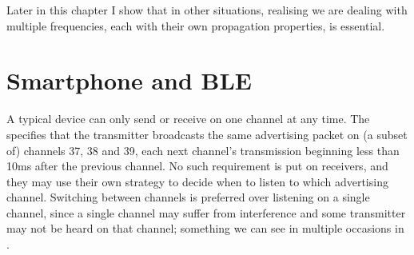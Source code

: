 Later in this chapter I show that in other situations, realising we are dealing with multiple frequencies, each with their own propagation properties, is essential.

\section{Smartphone and BLE}
\label{sec:rss-smartphone}
A typical device can only send or receive on one channel at any time.
The \BTspec \citep{bluetooth40spec} specifies that the transmitter broadcasts the same advertising packet on (a subset of) channels 37, 38 and 39, each next channel's transmission beginning less than 10ms after the previous channel. 
No such requirement is put on receivers, and they may use their own strategy to decide when to listen to which advertising channel.
Switching between channels is preferred over listening on a single channel, since a single channel may suffer from interference and some transmitter may not be heard on that channel; something we can see in multiple occasions in .

